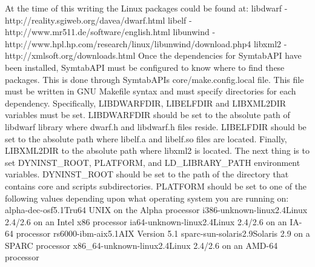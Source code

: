 At the time of this writing the Linux packages could be found at:
libdwarf - http://reality.sgiweb.org/davea/dwarf.html
libelf - http://www.mr511.de/software/english.html
libunwind - http://www.hpl.hp.com/research/linux/libunwind/download.php4
libxml2 - http://xmlsoft.org/downloads.html
Once the dependencies for SymtabAPI have been installed, SymtabAPI must be configured to know where to find these packages. This is done through SymtabAPIs core/make.config.local file. This file must be written in GNU Makefile syntax and must specify directories for each dependency. Specifically, LIBDWARFDIR, LIBELFDIR and LIBXML2DIR variables must be set. LIBDWARFDIR should be set to the absolute path of libdwarf library where dwarf.h and libdwarf.h files reside. LIBELFDIR should be set to the absolute path where libelf.a and libelf.so files are located. Finally, LIBXML2DIR to the absolute path where libxml2 is located.
The next thing is to set DYNINST_ROOT, PLATFORM, and LD_LIBRARY_PATH environment variables. DYNINST_ROOT should be set to the path of the directory that contains core and scripts subdirectories.
PLATFORM should be set to one of the following values depending upon what operating system you are running on:
alpha-dec-osf5.1Tru64 UNIX on the Alpha processor
i386-unknown-linux2.4Linux 2.4/2.6 on an Intel x86 processor
ia64-unknown-linux2.4Linux 2.4/2.6 on an IA-64 processor
rs6000-ibm-aix5.1AIX Version 5.1
sparc-sun-solaris2.9Solaris 2.9 on a SPARC processor
x86_64-unknown-linux2.4Linux 2.4/2.6 on an AMD-64 processor

